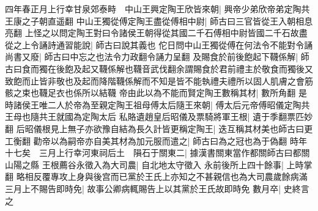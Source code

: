 四年春正月上行幸甘泉郊泰畤　中山王興定陶王欣皆來朝|{
	興帝少弟欣帝弟定陶共王康之子朝直遥翻}
中山王獨從傅定陶王盡從傅相中尉|{
	師古曰三官皆從王入朝相息亮翻}
上怪之以問定陶王對曰令諸侯王朝得從其國二千石傅相中尉皆國二千石故盡從之上令誦詩通習能說|{
	師古曰說其義也}
佗日問中山王獨從傅在何法令不能對令誦尚書又廢|{
	師古曰中忘之也法令力政翻令誦力呈翻}
及賜食於前後飽起下韈係解|{
	師古曰食而獨在後飽及起又韈係解也韈音武伐翻余謂賜食於君前禮主於敬食而獨後又致飽而止皆非敬也及起而降階韈係解而不知是皆不能執禮夫禮所以固人肌膚之會筋骸之束也韈足衣也係所以結韈}
帝由此以為不能而賢定陶王數稱其材|{
	數所角翻}
是時諸侯王唯二人於帝為至親定陶王祖母傅太后隨王來朝|{
	傅太后元帝傅昭儀定陶共王母也隨共王就國為定陶太后}
私賂遺趙皇后昭儀及票騎將軍王根|{
	遺于季翻票匹妙翻}
后昭儀根見上無子亦欲豫自結為長久計皆更稱定陶王|{
	迭互稱其材美也師古曰更工衡翻}
勸帝以為嗣帝亦自美其材為加元服而遣之|{
	師古曰為之冠也為于偽翻}
時年十七矣　三月上行幸河東祠后土　隕石于關東二|{
	據漢書關東當作都關師古曰都關山陽之縣}
王根薦谷永徵入為大司農|{
	自北地太守徵入}
永前後所上四十餘事|{
	上時掌翻}
略相反覆專攻上身與後宫而已黨於王氏上亦知之不甚親信也為大司農歲餘病滿三月上不賜告即時免|{
	故事公卿病輒賜告上以其黨於王氏故即時免}
數月卒|{
	史終言之}



